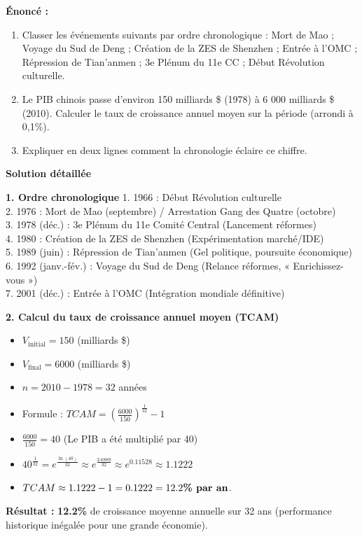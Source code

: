 \documentclass[11pt]{article}
\newcommand{\cle}[1]{{\popxbold\color{popdark}#1}}
\begin{document}
\begin{exoresolu}
\textbf{Énoncé :} 
\begin{enumerate}
    \item Classer les événements suivants par ordre chronologique : Mort de Mao ; Voyage du Sud de Deng ; Création de la ZES de Shenzhen ; Entrée à l'OMC ; Répression de Tian'anmen ; 3e Plénum du 11e CC ; Début Révolution culturelle.
    \item Le PIB chinois passe d'environ 150 milliards \$ (1978) à 6 000 milliards \$ (2010). Calculer le taux de croissance annuel moyen sur la période (arrondi à 0,1\%).
    \item Expliquer en deux lignes comment la chronologie éclaire ce chiffre.
\end{enumerate}

\tcblower
\textbf{Solution détaillée}

\textbf{1. Ordre chronologique}
1. 1966 : Début Révolution culturelle \\
2. 1976 : Mort de Mao (septembre) / Arrestation Gang des Quatre (octobre) \\
3. 1978 (déc.) : \cle{3e Plénum du 11e Comité Central} (Lancement réformes) \\
4. 1980 : \cle{Création de la ZES de Shenzhen} (Expérimentation marché/IDE) \\
5. 1989 (juin) : \cle{Répression de Tian'anmen} (Gel politique, poursuite économique) \\
6. 1992 (janv.-fév.) : \cle{Voyage du Sud de Deng} (Relance réformes, « Enrichissez-vous ») \\
7. 2001 (déc.) : \cle{Entrée à l'OMC} (Intégration mondiale définitive)

\textbf{2. Calcul du taux de croissance annuel moyen (TCAM)}
\begin{itemize}
    \item $V_{\text{initial}} = 150$ (milliards \$)
    \item $V_{\text{final}} = 6000$ (milliards \$)
    \item $n = 2010 - 1978 = 32$ années
    \item Formule : $TCAM = \left( \frac{6000}{150} \right)^{\frac{1}{32}} - 1$
    \item $\frac{6000}{150} = 40$ (Le PIB a été multiplié par 40)
    \item $40^{\frac{1}{32}} = e^{\frac{\ln(40)}{32}} \approx e^{\frac{\num{3,6889}}{32}} \approx e^{\num{0,11528}} \approx \num{1,1222}$
    \item $TCAM \approx \num{1,1222} - 1 = \num{0,1222} = \textbf{\num{12,2}\% par an}$.
\end{itemize}
\textbf{Résultat :} \textbf{\num{12,2}\%} de croissance moyenne annuelle sur 32 ans (performance historique inégalée pour une grande économie).


\end{exoresolu}
\end{document}
